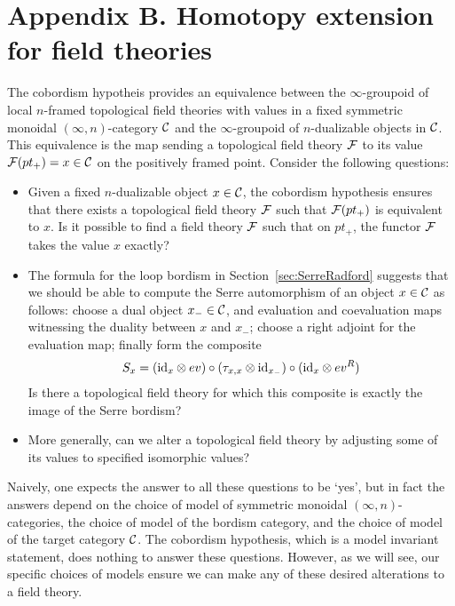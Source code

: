\documentclass[a4paper]{amsart}
\begin{document}
\section*{Appendix B. Homotopy extension for field theories} \label{sec:Hom_ext_field_thy}


The cobordism hypotheis provides an equivalence between the $\infty$-groupoid of local $n$-framed topological field theories with values in a fixed symmetric monoidal $(\infty,n)$-category $\mathcal C$ and the $\infty$-groupoid of $n$-dualizable objects in $\mathcal C$. This equivalence is the map sending a topological field theory $\mathcal F$ to its value $\mathcal F(pt_+) = x \in \mathcal C$ on the positively framed point. Consider the following questions:
\begin{itemize}
	\item Given a fixed $n$-dualizable object $x \in \mathcal C$, the cobordism hypothesis ensures that 
	there exists a topological field theory $\mathcal F$ such that $\mathcal F(pt_+)$ is equivalent to $x$. Is it possible to find a field theory $\mathcal F$ such that on $pt_+$, the functor $\mathcal F$ takes the value $x$ exactly? 
	\item The formula for the loop bordism in Section~\ref{sec:SerreRadford} suggests that we should be able to compute the Serre automorphism of an object $x \in \mathcal C$ as follows: choose a dual object $x_- \in \mathcal C$, and evaluation and coevaluation maps witnessing the duality between $x$ and $x_-$; choose a right adjoint for the evaluation map; finally form the composite
	\begin{equation*}
		S_x = (\mathrm{id}_{x} \otimes ev) \circ (\tau_{x, x} \otimes \mathrm{id}_{x_-}) \circ (\mathrm{id}_{x} \otimes ev^R)
	\end{equation*}
Is there a topological field theory for which this composite is exactly the image of the Serre bordism? 
	\item More generally, can we alter a topological field theory by adjusting some of its values to specified isomorphic values?
\end{itemize}
\nid Naively, one expects the answer to all these questions to be `yes', but in fact the answers depend on the choice of model of symmetric monoidal $(\infty,n)$-categories, the choice of model of the bordism category, and the choice of model of the target category $\mathcal C$.  The cobordism hypothesis, which is a model invariant statement, does nothing to answer these questions.  However, as we will see, our specific choices of models ensure we can make any of these desired alterations to a field theory.
\end{document}
